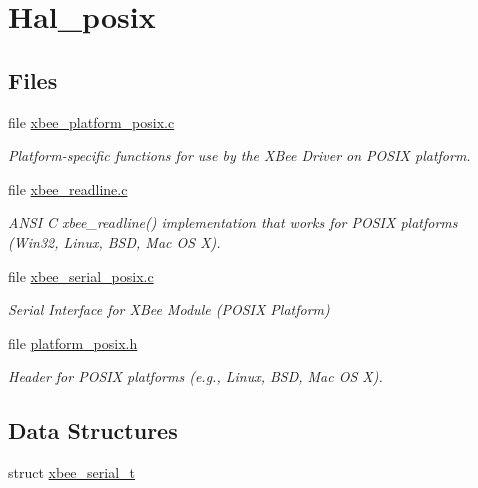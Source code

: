 \hypertarget{group__hal__posix}{\section{Hal\-\_\-posix}
\label{group__hal__posix}
}
\subsection*{Files}
\begin{DoxyCompactItemize}
\item 
file \hyperlink{xbee__platform__posix_8c}{xbee\-\_\-platform\-\_\-posix.\-c}
\begin{DoxyCompactList}\small\item\em Platform-\/specific functions for use by the X\-Bee Driver on P\-O\-S\-I\-X platform. \end{DoxyCompactList}\item 
file \hyperlink{xbee__readline_8c}{xbee\-\_\-readline.\-c}
\begin{DoxyCompactList}\small\item\em A\-N\-S\-I C xbee\-\_\-readline() implementation that works for P\-O\-S\-I\-X platforms (Win32, Linux, B\-S\-D, Mac O\-S X). \end{DoxyCompactList}\item 
file \hyperlink{xbee__serial__posix_8c}{xbee\-\_\-serial\-\_\-posix.\-c}
\begin{DoxyCompactList}\small\item\em Serial Interface for X\-Bee Module (P\-O\-S\-I\-X Platform) \end{DoxyCompactList}\item 
file \hyperlink{platform__posix_8h}{platform\-\_\-posix.\-h}
\begin{DoxyCompactList}\small\item\em Header for P\-O\-S\-I\-X platforms (e.\-g., Linux, B\-S\-D, Mac O\-S X). \end{DoxyCompactList}\end{DoxyCompactItemize}
\subsection*{Data Structures}
\begin{DoxyCompactItemize}
\item 
struct \hyperlink{structxbee__serial__t}{xbee\-\_\-serial\-\_\-t}
\end{DoxyCompactItemize}
